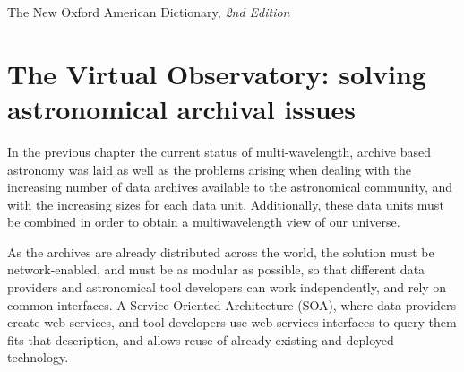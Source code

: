 {The New Oxford American Dictionary, \emph{2nd Edition}}


	
\section[The VO: solving astronomical archival issues]
[The VO: solving astronomical archival issues]
{The Virtual Observatory: solving astronomical archival issues}
\label{sec:the_vo_and_archival_issues}
	
	In the previous chapter the current status of multi-wavelength,
	archive based astronomy was laid as well as the problems
	arising when dealing with the increasing number of data
	archives available to the astronomical community, and with the
	increasing sizes for each data unit. Additionally, these data
	units must be combined in order to obtain a multiwavelength
	view of our universe.
	
	 As the archives are already distributed across the world, the
	solution must be network-enabled, and must be as modular as
	possible, so that different data providers and astronomical
	tool developers can work independently, and rely on common
	interfaces. A Service Oriented Architecture (SOA), where data
	providers create web-services, and tool developers use
	web-services interfaces to query them fits that description,
	and allows reuse of already existing and deployed technology.
	
